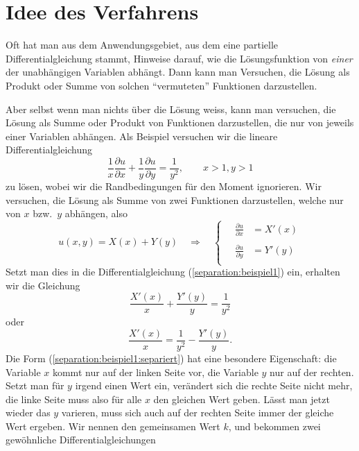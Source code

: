 \section{Idee des Verfahrens}
Oft hat man aus dem Anwendungsgebiet, aus dem eine partielle
Differentialgleichung stammt, Hinweise darauf, wie die Lösungsfunktion
von {\em einer} der unabhängigen Variablen abhängt.
Dann kann man Versuchen, die Lösung als Produkt oder Summe von
solchen ``vermuteten'' Funktionen darzustellen.

Aber selbst wenn man nichts über die Lösung weiss, kann man 
versuchen, die Lösung als Summe oder Produkt von Funktionen darzustellen,
die nur von jeweils einer Variablen abhängen. Als Beispiel versuchen
wir die lineare Differentialgleichung 
\begin{equation}
\frac1x
\frac{\partial u}{\partial x}
+
\frac1y
\frac{\partial u}{\partial y}
=\frac1{y^2}
,
\qquad x>1, y>1
\label{separation:beispiel1}
\end{equation}
zu lösen, wobei wir die Randbedingungen für den Moment ignorieren.
Wir versuchen, die Lösung als Summe von zwei Funktionen darzustellen,
welche nur von $x$ bzw.~$y$ abhängen, also
\begin{equation}
u(x,y)=X(x)+Y(y)
\quad\Rightarrow\quad
\begin{cases}
\quad{\displaystyle \frac{\partial u}{\partial x}}&=X'(x)\\
\\
\quad{\displaystyle \frac{\partial u}{\partial y}}&=Y'(y)\\
\end{cases}
\label{separation:beispiel1:ansatz}
\end{equation}
Setzt man dies in die Differentialgleichung (\ref{separation:beispiel1})
ein, erhalten wir die Gleichung
\[
\frac{X'(x)}{x}+\frac{Y'(y)}{y}=\frac1{y^2}
\]
oder
\begin{equation}
\frac{X'(x)}{x}
=\frac1{y^2}
-\frac{Y'(y)}{y}.
\label{separation:beispiel1:separiert}
\end{equation}
Die Form (\ref{separation:beispiel1:separiert}) hat eine besondere
Eigenschaft: die Variable $x$ kommt nur auf der linken Seite vor,
die Variable $y$ nur auf der rechten. Setzt man für $y$ irgend
einen Wert ein, verändert sich die rechte Seite nicht mehr,
die linke Seite muss also für alle $x$ den gleichen Wert geben.
Lässt man jetzt wieder das $y$ varieren, muss sich auch auf der rechten
Seite immer der gleiche Wert ergeben. Wir nennen den gemeinsamen Wert
$k$, und bekommen zwei gewöhnliche Differentialgleichungen
